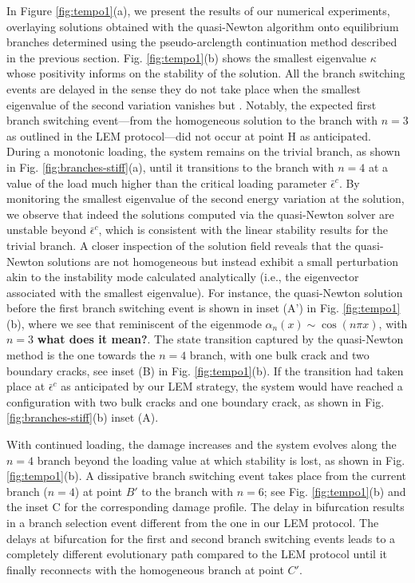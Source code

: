 In Figure \ref{fig:tempo1}(a), we present the results of our numerical experiments, overlaying solutions obtained with the quasi-Newton algorithm onto equilibrium branches determined using the pseudo-arclength continuation method described in the previous section. Fig. \ref{fig:tempo1}(b) shows the smallest eigenvalue $\kappa$ whose positivity informs on the stability of the solution. All the branch switching events are delayed in the sense they do not take place when the smallest eigenvalue of the second variation vanishes but . Notably, the expected first branch switching event—from the {homogeneous} solution to the branch with \(n=3\) as outlined in the LEM protocol—did not occur at point H as anticipated. During a monotonic loading, the system remains on the trivial branch, as shown in Fig. \ref{fig:branches-stiff}(a), until it transitions to the branch with \(n=4\) at a value of the load much higher than the critical loading parameter \(\bar{\epsilon}^c\). By monitoring the smallest eigenvalue of the second energy variation at the solution, we observe that indeed the solutions computed via the quasi-Newton solver are unstable beyond \(\bar{\epsilon}^c\), which is consistent with the linear stability results for the trivial branch. A closer inspection of the solution field reveals that the quasi-Newton solutions are not homogeneous but instead exhibit a small perturbation akin to the instability mode calculated analytically (i.e., the eigenvector associated with the smallest eigenvalue). For instance, the  quasi-Newton solution before the first branch switching event is shown in inset (A') in Fig. \ref{fig:tempo1}(b), where we see that  reminiscent of the eigenmode \(\alpha_n(x) \sim \cos(n\pi x)\),  with \(n=3\) \textbf{what does it mean?}. The state transition captured by the quasi-Newton method is the one towards the  \(n=4\) branch, with one bulk crack and two boundary cracks, see inset (B) in Fig. \ref{fig:tempo1}(b). If the transition had taken place at \(\bar{\epsilon}^c\) as anticipated by our LEM strategy, the system would have reached a configuration with two bulk cracks and one boundary crack, as shown in Fig. \ref{fig:branches-stiff}(b) inset (A).

With continued loading, the damage increases and the system evolves along the \(n=4\) branch beyond the loading value at which stability is lost, as shown in Fig. \ref{fig:tempo1}(b). A dissipative branch switching event takes place from the current branch (\(n=4\)) at point \(B'\) to the branch with \(n=6\); see Fig. \ref{fig:tempo1}(b) and the inset C for the corresponding damage profile. The delay in bifurcation results in a branch selection event different from the one in our LEM protocol. The delays at bifurcation for the first and second branch switching events leads to a completely different evolutionary path compared to the LEM protocol until it finally reconnects with the homogeneous branch at point \(C'\).

